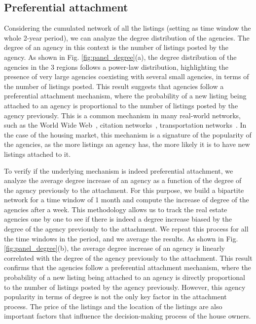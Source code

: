 \subsection{Preferential attachment}

Considering the cumulated network of all the listings (setting as time window the whole 2-year period), we can analyze the degree distribution of the agencies. The degree of an agency in this context is the number of listings posted by the agency. As shown in Fig. \ref{fig:panel_degree}(a), the degree distribution of the agencies in the 3 regions follows a power-law distribution, highlighting the presence of very large agencies coexisting with several small agencies, in terms of the number of listings posted. This result suggests that agencies follow a preferential attachment mechanism, where the probability of a new listing being attached to an agency is proportional to the number of listings posted by the agency previously. This is a common mechanism in many real-world networks, such as the World Wide Web~\cite{barabasi1999emergence}, citation networks~\cite{redner1998popular}, transportation networks~\cite{barrat2004architecture}. In the case of the housing market, this mechanism is a signature of the popularity of the agencies, as the more listings an agency has, the more likely it is to have new listings attached to it.

To verify if the underlying mechanism is indeed preferential attachment, we analyze the average degree increase of an agency as a function of the degree of the agency previously to the attachment. For this purpose, we build a bipartite network for a time window of 1 month and compute the increase of degree of the agencies after a week. This methodology allows us to track the real estate agencies one by one to see if there is indeed a degree increase biased by the degree of the agency previously to the attachment. We repeat this process for all the time windows in the period, and we average the results. As shown in Fig. \ref{fig:panel_degree}(b), the average degree increase of an agency is linearly correlated with the degree of the agency previously to the attachment. This result confirms that the agencies follow a preferential attachment mechanism, where the probability of a new listing being attached to an agency is directly proportional to the number of listings posted by the agency previously. However, this agency popularity in terms of degree is not the only key factor in the attachment process. The price of the listings and the location of the listings are also important factors that influence the decision-making process of the house owners.

